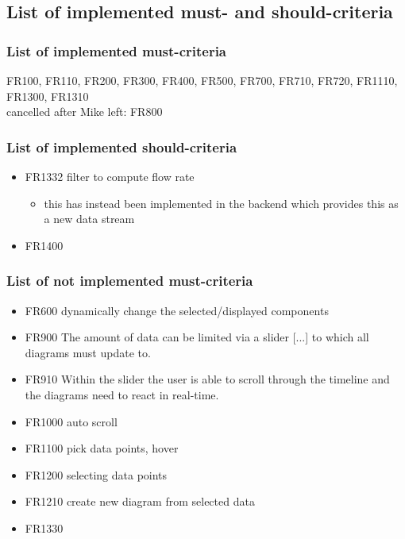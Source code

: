 \documentclass[oneside, english, final]{design}
\begin{document}
\newpage

\subsection{List of implemented must- and should-criteria}
\subsubsection{List of implemented must-criteria}
FR100, FR110, FR200, FR300, FR400, FR500, FR700, FR710, FR720, FR1110, FR1300, FR1310
\\
cancelled after Mike left: FR800

\subsubsection{List of implemented should-criteria}
\begin{itemize}
  \item{FR1332 filter to compute flow rate}
  \begin{itemize}
    \item{this has instead been implemented in the backend which provides this as a new data stream}
  \end{itemize}
  \item{FR1400}
\end{itemize}

\subsubsection{List of not implemented must-criteria}
\begin{itemize}
  \item{FR600 dynamically change the selected/displayed components}
  \item{FR900 The amount of data can be limited via a slider [...]}
to which all diagrams must update to.
  \item{FR910 Within the slider the user is able to scroll through the timeline and the diagrams need to react in real-time.}
  \item{FR1000 auto scroll}
  \item{FR1100 pick data points, hover}
  \item{FR1200 selecting data points}
  \item{FR1210 create new diagram from selected data}
  \item{FR1330}
\end{itemize}
\end{document}
